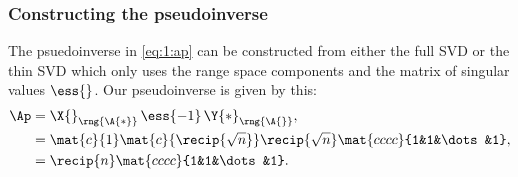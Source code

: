 \subsubsection{Constructing the pseudoinverse}
The psuedoinverse in \eqref{eq:1:ap} can be constructed from either the full SVD or the thin SVD which only uses the range space components and the matrix of singular values $\ess{}$. Our pseudoinverse is given by this:
\begin{equation}
  \begin{split}
     \Ap &= \X{}_{\rng{\A{*}}} \, \ess{-1} \, \Y{*}_{\rng{\A{}}},\\
         &= \mat{c}{1} \mat{c}{\recip{\sqrt{n}}} \recip{\sqrt{n}}\mat{cccc}{1&1&\dots&1}, \\
         &= \recip{n}\mat{cccc}{1&1&\dots&1}.
  \end{split}
\end{equation} 

